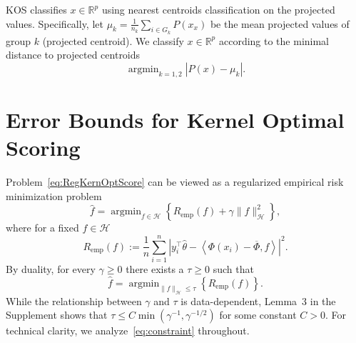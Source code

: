 \documentclass[twoside, onecolumn]{article}
\def\R{\mathbb{R}}
\def\Hcal{\mathcal{H}}
\def\Hcal{\mathcal{H}}
\def\Score{\widehat{\theta}}
\DeclareMathOperator*{\argmin}{argmin}
\begin{document}
KOS classifies $x\in \mathbb{R}^{p}$ using nearest centroids classification on the projected values. Specifically, let $\mu_k=\frac{1}{n_k}\sum_{i\in G_k}P(x_x)$ be the mean projected values of group 
$k$ (projected centroid). We classify $x\in \R^p$ according to the minimal distance to projected centroids
$$
\argmin_{k=1,2} |P(x)-\mu_{k}|.
$$


\section{Error Bounds for Kernel Optimal Scoring}\label{sec:Theory}

Problem~\eqref{eq:RegKernOptScore} can be viewed as a regularized empirical risk minimization problem
\begin{equation}\label{eq:penalty}
\widehat f = \argmin_{f\in \mathcal{H}}\left\{R_{\text{emp}}(f) + \gamma \|f\|^2_{\mathcal{H}}\right\},
\end{equation}
where for a fixed $f\in \mathcal{H}$
\begin{equation}\label{eq:emprisk}
R_{\text{emp}}(f):=\frac{1}{n}\sum_{i=1}^{n}|y_i^{\top}\Score-\left<\Phi(x_i)-\overline{\Phi},f\right>|^{2}.
\end{equation}
By duality, for every $\gamma \geq 0$ there exists a $\tau \geq 0$ such that 
\begin{equation}\label{eq:constraint}
\widehat f = \argmin_{\|f\|_{\Hcal}\leq \tau}\left\{R_{\text{emp}}(f)\right\}.
\end{equation}
While the relationship between $\gamma$ and $\tau$ is data-dependent, Lemma~3 in the Supplement shows that $\tau \leq C\min(\gamma^{-1},\gamma^{-1/2})$ for some constant $C>0$. For technical clarity, we analyze~\eqref{eq:constraint} throughout.
\end{document}
